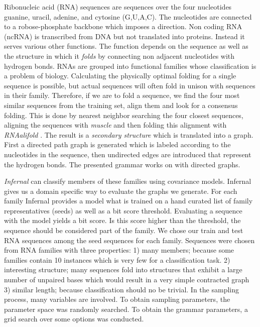 \documentclass{article}
\begin{document}
Ribonucleic acid (RNA) sequences are sequences over the four nucleotides guanine,
uracil, adenine, and cytosine (G,U,A,C).
The nucleotides are connected to a robose-phosphate backbone which imposes a
direction.  Non coding RNA (ncRNA) is transcribed from DNA but not
translated into proteins. Instead it serves various other functions.
The function depends on the sequence as well as the structure in which it 
\emph{folds} by connecting non adjacent nucleotides with hydrogen bonds. 
RNAs are grouped into functional families\cite{rfam} whose classification
is a problem of biology.
Calculating the physically optimal folding for a single sequence
is possible, but actual sequences will often fold in unison with 
sequences in their family. Therefore, if we are to fold a sequence,
we find the four most similar sequences from the training set, align them  and 
look for a consensus folding.
This is done by nearest neighbor searching the four closest sequences, 
aligning the sequences with \emph{muscle} \cite{muscle}
and then folding this alignment with \emph{RNAalifold}
\cite{rnaalifold}.  
The result is a \emph{secondary structure} which is translated into a 
graph. First a directed path graph is generated which is labeled
according to the nucleotides in the sequence, then undirected edges 
are introduced that represent the hydrogen bonds.
The presented grammar works on with directed graphs.

\emph{Infernal}\cite{infernal} can classify members of these families using
covariance models. Infernal gives us a domain specific way to evaluate
the graphs we generate. 
For each family Infernal provides a model what is trained on 
a hand curated list of family representatives (seeds) as well as a 
bit score threshold. Evaluating a sequence with the model yields a bit score.
Is this score higher than the threshold, the sequence should be considered 
part of the family. 
We chose our train and test RNA sequences among the seed sequences for each
family. Sequences were chosen from RNA families with three properties:
1) many members; because some families contain 10
instances which is very few for a classification task. 2)  interesting 
structure; many sequences fold into structures that exhibit a large number of 
unpaired bases which would result in a very simple contracted graph
3) similar length; because classification should no be trivial.
In the sampling process, many variables are involved.
To obtain 
sampling parameters, the parameter space was randomly searched.
To obtain the grammar parameters, a grid search over some options was conducted.
\end{document}
